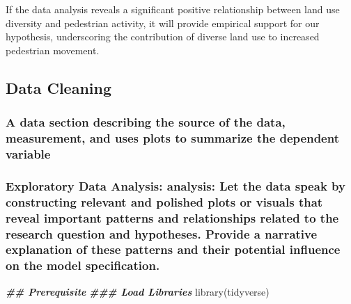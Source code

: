 \documentclass[
]{article}
\newenvironment{Shaded}{\begin{snugshade}}{\end{snugshade}}
\newcommand{\DocumentationTok}[1]{\textcolor[rgb]{0.56,0.35,0.01}{\textbf{\textit{#1}}}}
\newcommand{\FunctionTok}[1]{\textcolor[rgb]{0.00,0.00,0.00}{#1}}
\newcommand{\NormalTok}[1]{#1}
\begin{document}
If the data analysis reveals a significant positive relationship between
land use diversity and pedestrian activity, it will provide empirical
support for our hypothesis, underscoring the contribution of diverse
land use to increased pedestrian movement.

\hypertarget{data-cleaning}{%
\subsection{Data Cleaning}\label{data-cleaning}}

\hypertarget{a-data-section-describing-the-source-of-the-data-measurement-and-uses-plots-to-summarize-the-dependent-variable}{%
\subsubsection{A data section describing the source of the data,
measurement, and uses plots to summarize the dependent
variable}\label{a-data-section-describing-the-source-of-the-data-measurement-and-uses-plots-to-summarize-the-dependent-variable}}

\hypertarget{exploratory-data-analysis-analysis-let-the-data-speak-by-constructing-relevant-and-polished-plots-or-visuals-that-reveal-important-patterns-and-relationships-related-to-the-research-question-and-hypotheses.-provide-a-narrative-explanation-of-these-patterns-and-their-potential-influence-on-the-model-specification.}{%
\subsubsection{Exploratory Data Analysis: analysis: Let the data speak
by constructing relevant and polished plots or visuals that reveal
important patterns and relationships related to the research question
and hypotheses. Provide a narrative explanation of these patterns and
their potential influence on the model
specification.}\label{exploratory-data-analysis-analysis-let-the-data-speak-by-constructing-relevant-and-polished-plots-or-visuals-that-reveal-important-patterns-and-relationships-related-to-the-research-question-and-hypotheses.-provide-a-narrative-explanation-of-these-patterns-and-their-potential-influence-on-the-model-specification.}}

\begin{Shaded}
\begin{Highlighting}[]
\DocumentationTok{\#\# Prerequisite}
\DocumentationTok{\#\#\# Load Libraries}
\FunctionTok{library}\NormalTok{(tidyverse)}
\end{Highlighting}
\end{Shaded}
\end{document}
